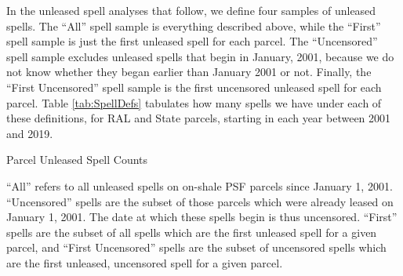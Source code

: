 \begin{appendices}
In the unleased spell analyses that follow, we define four samples of unleased spells.  The ``All'' spell sample is everything described above, while the ``First'' spell sample is just the first unleased spell for each parcel.  The ``Uncensored'' spell sample excludes unleased spells that begin in January, 2001, because we do not know whether they began earlier than January 2001 or not.  Finally, the ``First Uncensored'' spell sample is the first uncensored unleased spell for each parcel.  Table \ref{tab:SpellDefs} tabulates how many spells we have under each of these definitions, for RAL and State parcels, starting in each year between 2001 and 2019.

\begin{table}[htbp]
	\begin{center}
		\begin{threeparttable}
			\caption{Parcel Unleased Spell Counts}\label{tab:SpellDefs}
			\label{tab:summary_stats}
			\small
			
			\footnotesize
			\begin{tablenotes}
				\item ``All'' refers to all unleased spells on on-shale PSF parcels since January 1, 2001.  ``Uncensored'' spells are the subset of those parcels which were already leased on January 1, 2001.  The date at which these spells begin is thus uncensored.  ``First'' spells are the subset of all spells which are the first unleased spell for a given parcel, and ``First Uncensored'' spells are the subset of uncensored spells which are the first unleased, uncensored spell for a given parcel.
			\end{tablenotes}
		\end{threeparttable}
	\end{center}
\end{table}


\end{appendices}
